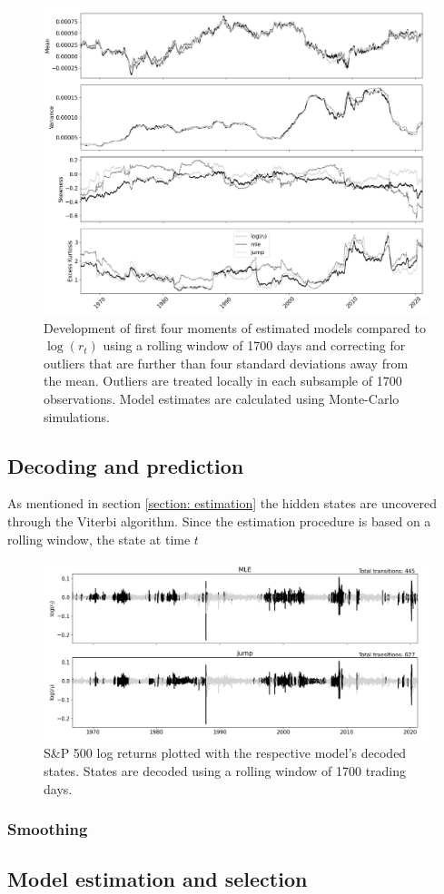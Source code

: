 \begin{figure}[H] 
    \centering
    \includegraphics[width=1.0\textwidth]{analysis/stylized_facts/images/rolling_moments_outlier_corrected.png}
    \caption{Development of first four moments of estimated models compared to $\log(r_t)$ using a rolling window of 1700 days and correcting for outliers that are further than four standard deviations away from the mean. Outliers are treated locally in each subsample of 1700 observations. Model estimates are calculated using Monte-Carlo simulations.}
    \label{fig:stylized_facts_rolling_moments_outliers} 
\end{figure}


\subsection{Decoding and prediction}
As mentioned in section \ref{section: estimation} the hidden states are uncovered through the Viterbi algorithm. Since the estimation procedure is based on a rolling window, the state at time $t$

\begin{figure}[H] 
    \centering
    \includegraphics[width=1.0\textwidth]{analysis/stylized_facts/images/decoded_states.png}
    \caption{S\&P 500 log returns plotted with the respective model's decoded states. States are decoded using a rolling window of 1700 trading days.}
    \label{fig:stylized_facts_decoded_states} 
\end{figure}

\subsubsection{Smoothing}

\subsection{Model estimation and selection}
\label{Subsection: Model estimation and selection}
